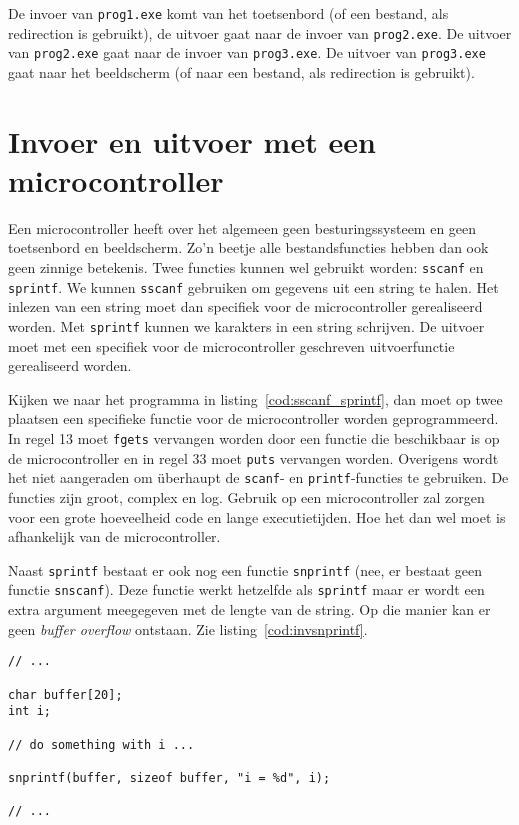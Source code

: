 De invoer van \lstinline|prog1.exe| komt van het toetsenbord (of een bestand, als redirection is gebruikt), de uitvoer gaat naar de invoer van \lstinline|prog2.exe|. De uitvoer van \lstinline|prog2.exe| gaat naar de invoer van \lstinline|prog3.exe|. De uitvoer van \lstinline|prog3.exe| gaat naar het beeldscherm (of naar een bestand, als redirection is gebruikt).


\iffalse
\advanced
\section{Invoer en uitvoer met een microcontroller}
\label{sec:invoeruitvoermcu}
Een microcontroller heeft over het algemeen geen besturingssysteem en geen toetsenbord en beeldscherm. Zo'n beetje alle bestandsfuncties hebben dan ook geen zinnige betekenis. Twee functies kunnen wel gebruikt worden: \texttt{sscanf} en \texttt{sprintf}. We kunnen \texttt{sscanf} gebruiken om gegevens uit een string te halen. Het inlezen van een string moet dan specifiek voor de microcontroller gerealiseerd worden. Met \texttt{sprintf} kunnen we karakters in een string schrijven. De uitvoer moet met een specifiek voor de microcontroller geschreven uitvoerfunctie gerealiseerd worden.

Kijken we naar het programma in listing~\ref{cod:sscanf_sprintf}, dan moet op twee plaatsen een specifieke functie voor de microcontroller worden geprogrammeerd. In regel 13 moet \texttt{fgets} vervangen worden door een functie die beschikbaar is op de microcontroller en in regel 33 moet \texttt{puts} vervangen worden. Overigens wordt het niet aangeraden om überhaupt de \texttt{scanf}- en \texttt{printf}-functies te gebruiken. De functies zijn groot, complex en log. Gebruik op een microcontroller zal zorgen voor een grote  hoeveelheid code en lange executietijden. Hoe het dan wel moet is afhankelijk van de microcontroller.

Naast \texttt{sprintf} bestaat er ook nog een functie \texttt{snprintf} (nee, er bestaat geen functie \texttt{snscanf}). Deze functie werkt hetzelfde als \texttt{sprintf} maar er wordt een extra argument meegegeven met de lengte van de string. Op die manier kan er geen \textsl{buffer overflow} ontstaan. Zie listing~\ref{cod:invsnprintf}.

\begin{lstlisting}[caption=Gebruik van \texttt{snprintf} bij het afdrukken naar een string.,label=cod:invsnprintf]
// ...

char buffer[20];
int i;

// do something with i ...

snprintf(buffer, sizeof buffer, "i = %d", i);

// ...
\end{lstlisting}

